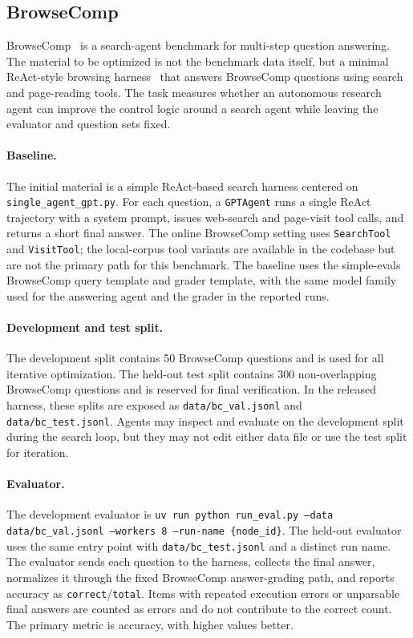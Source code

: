\documentclass{llmxive}
\begin{document}
\subsection{BrowseComp}
\label{app:benchmark-browsecomp}

BrowseComp~\citep{browsecomp} is a search-agent benchmark for
multi-step question answering.
The material to be optimized is not the benchmark data itself, but a minimal
ReAct-style browsing harness~\citep{react} that answers BrowseComp questions
using search and page-reading tools.
The task measures whether an autonomous research agent can improve the control
logic around a search agent while leaving the evaluator and question sets
fixed.

\paragraph{Baseline.}
The initial material is a simple ReAct-based search harness centered
on \texttt{single\_agent\_gpt.py}.
For each question, a \texttt{GPTAgent} runs a single ReAct trajectory with a
system prompt, issues web-search and page-visit tool calls, and returns a
short final answer.
The online BrowseComp setting uses \texttt{SearchTool} and \texttt{VisitTool};
the local-corpus tool variants are available in the codebase but are not the
primary path for this benchmark.
The baseline uses the simple-evals BrowseComp query template and grader
template, with the same model family used for the answering agent and the
grader in the reported runs.

\paragraph{Development and test split.}
The development split contains 50 BrowseComp questions and is used for all
iterative optimization.
The held-out test split contains 300 non-overlapping BrowseComp questions and
is reserved for final verification.
In the released harness, these splits are exposed as
\texttt{data/bc\_val.jsonl} and \texttt{data/bc\_test.jsonl}.
Agents may inspect and evaluate on the development split during the search
loop, but they may not edit either data file or use the test split for
iteration.

\paragraph{Evaluator.}
The development evaluator is
\texttt{uv run python run\_eval.py --data data/bc\_val.jsonl --workers 8 --run-name \{node\_id\}}.
The held-out evaluator uses the same entry point with
\texttt{data/bc\_test.jsonl} and a distinct run name.
The evaluator sends each question to the harness, collects the final answer,
normalizes it through the fixed BrowseComp answer-grading path, and reports
accuracy as \texttt{correct}/\texttt{total}.
Items with repeated execution errors or unparsable final answers are counted as
errors and do not contribute to the correct count.
The primary metric is accuracy, with higher values better.
\end{document}
